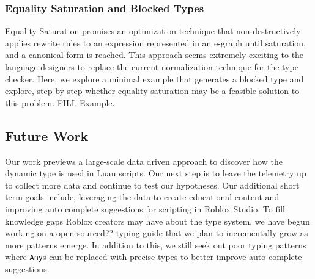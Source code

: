 \documentclass[acmsmall,screen,review,anonymous]{acmart}
\newcommand{\code}[1]{\texttt{#1}}
\newcommand{\Any}{\code{Any}}
\begin{document}
\subsubsection{Equality Saturation and Blocked Types}
\label{s:add:2}
Equality Saturation promises an optimization technique that non-destructively applies rewrite rules 
to an expression represented in an e-graph until saturation, and a canonical form is reached. This
approach seems extremely exciting to the language designers to replace the current normalization technique
for the type checker. Here, we explore a minimal example that generates a blocked type and explore,
step by step whether equality saturation may be a feasible solution to this problem. 
FILL Example.

\subsection{Future Work}
Our work previews a large-scale data driven approach to discover how
the dynamic type is used in Luau scripts. Our next step is to leave 
the telemetry up to collect more data and continue to test our hypotheses.
Our additional short term goals include, leveraging the data to create educational content and 
improving auto complete suggestions for scripting in Roblox Studio. 
To fill knowledge gaps Roblox creators may have about the type system, we 
have begun working on a open sourced?? typing guide that we plan to 
incrementally grow as more patterns emerge. In addition to this, we still 
seek out poor typing patterns where \Any{}s can be replaced with 
precise types to better improve auto-complete suggestions.






\end{document}
